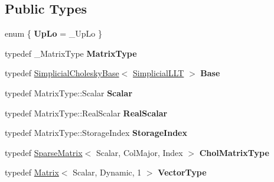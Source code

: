 \subsection*{Public Types}
\begin{DoxyCompactItemize}
\item 
\mbox{\label{class_eigen_1_1_simplicial_l_l_t_a98e97cb46ffd44308bab939b67cd6b0e}} 
enum \{ {\bfseries Up\+Lo} = \+\_\+\+Up\+Lo
 \}
\item 
\mbox{\label{class_eigen_1_1_simplicial_l_l_t_ae8b3a9509f9141d13419b8442f878688}} 
typedef \+\_\+\+Matrix\+Type {\bfseries Matrix\+Type}
\item 
\mbox{\label{class_eigen_1_1_simplicial_l_l_t_a97bc8661414c73c1a4da984466238741}} 
typedef \mbox{\hyperlink{class_eigen_1_1_simplicial_cholesky_base}{Simplicial\+Cholesky\+Base}}$<$ \mbox{\hyperlink{class_eigen_1_1_simplicial_l_l_t}{Simplicial\+L\+LT}} $>$ {\bfseries Base}
\item 
\mbox{\label{class_eigen_1_1_simplicial_l_l_t_ac01f03cb8ea25d9a4620c23ef1596c38}} 
typedef Matrix\+Type\+::\+Scalar {\bfseries Scalar}
\item 
\mbox{\label{class_eigen_1_1_simplicial_l_l_t_ad3b3cf7792b2e63ecaf2f5b10831bc10}} 
typedef Matrix\+Type\+::\+Real\+Scalar {\bfseries Real\+Scalar}
\item 
\mbox{\label{class_eigen_1_1_simplicial_l_l_t_a3ab91aa2067c30dc716b1216902da13d}} 
typedef Matrix\+Type\+::\+Storage\+Index {\bfseries Storage\+Index}
\item 
\mbox{\label{class_eigen_1_1_simplicial_l_l_t_ac222849c2fc32aba42173375b4aa550f}} 
typedef \mbox{\hyperlink{class_eigen_1_1_sparse_matrix}{Sparse\+Matrix}}$<$ Scalar, Col\+Major, Index $>$ {\bfseries Chol\+Matrix\+Type}
\item 
\mbox{\label{class_eigen_1_1_simplicial_l_l_t_ad9d8071e153d554fcb8e8e65ad7fee74}} 
typedef \mbox{\hyperlink{class_eigen_1_1_matrix}{Matrix}}$<$ Scalar, Dynamic, 1 $>$ {\bfseries Vector\+Type}

\end{DoxyCompactItemize}
